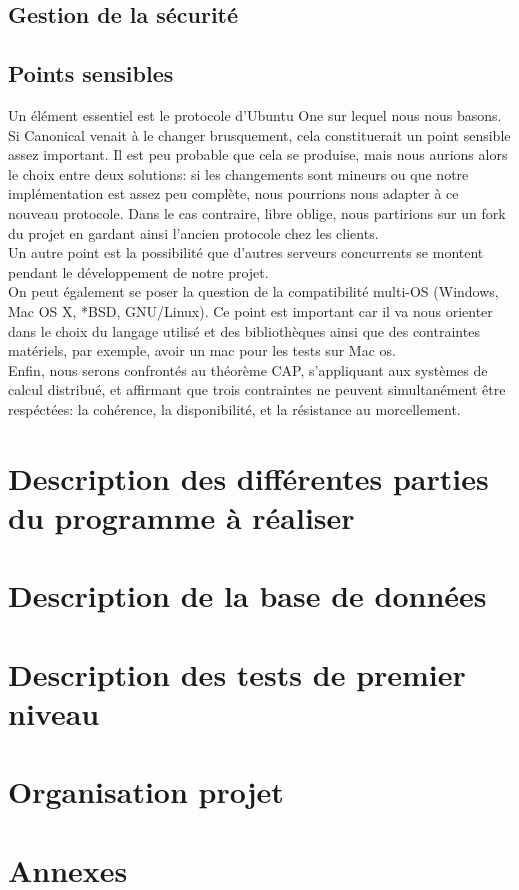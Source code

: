\documentclass[12pt]{report}
\begin{document}
\section{Gestion de la sécurité}
\section{Points sensibles}
Un élément essentiel est le protocole d'Ubuntu One sur lequel nous nous basons. Si Canonical venait à le changer brusquement, cela constituerait un point sensible assez important. Il est peu probable que cela se produise, mais nous aurions alors le choix entre deux solutions: si les changements sont mineurs ou que notre implémentation est assez peu complète, nous pourrions nous adapter à ce nouveau protocole. Dans le cas contraire, libre oblige, nous partirions sur un fork du projet en gardant ainsi l'ancien protocole chez les clients.\\

Un autre point est la possibilité que d'autres serveurs concurrents se montent pendant le développement de notre projet.\\

On peut également se poser la question de la compatibilité multi-OS (Windows, Mac OS X, *BSD, GNU/Linux). Ce point est important car il va nous orienter dans le choix du langage utilisé et des bibliothèques ainsi que des contraintes matériels, par exemple, avoir un mac pour les tests sur Mac os.\\

Enfin, nous serons confrontés au théorème CAP, s'appliquant aux systèmes de calcul distribué, et affirmant que trois contraintes ne peuvent simultanément être respéctées: la cohérence, la disponibilité, et la résistance au morcellement.

\chapter{Description des différentes parties du programme à réaliser}
\thispagestyle{EIP} %

\chapter{Description de la base de données}
\thispagestyle{EIP} %

\chapter{Description des tests de premier niveau}
\thispagestyle{EIP} %

\chapter{Organisation projet}
\thispagestyle{EIP} %

\chapter{Annexes}
\thispagestyle{EIP} %
\end{document}
